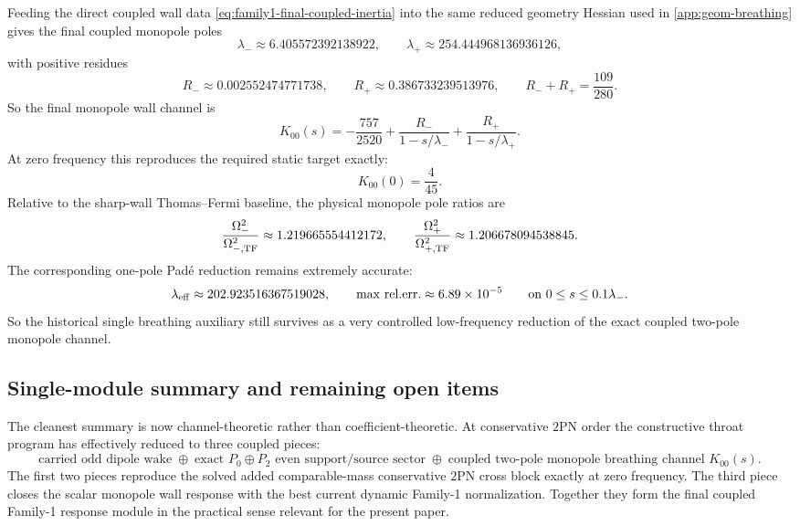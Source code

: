 \documentclass[11pt]{article}
\newcommand{\TwoPN}{\mathrm{2PN}}
\begin{document}
Feeding the direct coupled wall data
\cref{eq:family1-final-coupled-inertia} into the same reduced geometry Hessian used in
\cref{app:geom-breathing} gives the final coupled monopole poles
\begin{equation}
\lambda_-\approx 6.405572392138922,
\qquad
\lambda_+\approx 254.444968136936126,
\label{eq:family1-final-lambdas}
\end{equation}
with positive residues
\begin{equation}
R_-\approx 0.002552474771738,
\qquad
R_+\approx 0.386733239513976,
\qquad
R_-+R_+=\frac{109}{280}.
\label{eq:family1-final-residues}
\end{equation}
So the final monopole wall channel is
\begin{equation}
K_{00}(s)
=
-\frac{757}{2520}
+\frac{R_-}{1-s/\lambda_-}
+\frac{R_+}{1-s/\lambda_+}.
\label{eq:family1-final-K00s}
\end{equation}
At zero frequency this reproduces the required static target exactly:
\begin{equation}
K_{00}(0)=\frac{4}{45}.
\label{eq:family1-final-K00zero}
\end{equation}
Relative to the sharp-wall Thomas--Fermi baseline, the physical monopole pole ratios are
\begin{equation}
\frac{\Omega_-^2}{\Omega_{-,\rm TF}^2}\approx 1.219665554412172,
\qquad
\frac{\Omega_+^2}{\Omega_{+,\rm TF}^2}\approx 1.206678094538845.
\label{eq:family1-final-pole-ratios}
\end{equation}
The corresponding one-pole Pad\'e reduction remains extremely accurate:
\begin{equation}
\lambda_{\rm eff}\approx 202.923516367519028,
\qquad
\max\,\mathrm{rel.err.}\approx 6.89\times 10^{-5}
\qquad
\text{on }0\le s\le 0.1\lambda_-.
\label{eq:family1-final-pade}
\end{equation}
So the historical single breathing auxiliary still survives as a very controlled
low-frequency reduction of the exact coupled two-pole monopole channel.

\subsection{Single-module summary and remaining open items}
\label{app:family1-final-summary}

The cleanest summary is now channel-theoretic rather than coefficient-theoretic.
At conservative \(\TwoPN\) order the constructive throat program has effectively reduced to
three coupled pieces:
\begin{equation}
\boxed{
\text{carried odd dipole wake}
\;\oplus\;
\text{exact }P_0\oplus P_2\text{ even support/source sector}
\;\oplus\;
\text{coupled two-pole monopole breathing channel }K_{00}(s).
}
\label{eq:family1-final-boxed-summary}
\end{equation}
The first two pieces reproduce the solved added comparable-mass conservative \(\TwoPN\)
cross block exactly at zero frequency.
The third piece closes the scalar monopole wall response with the best current dynamic
Family-1 normalization.
Together they form the final coupled Family-1 response module in the practical sense
relevant for the present paper.
\end{document}
